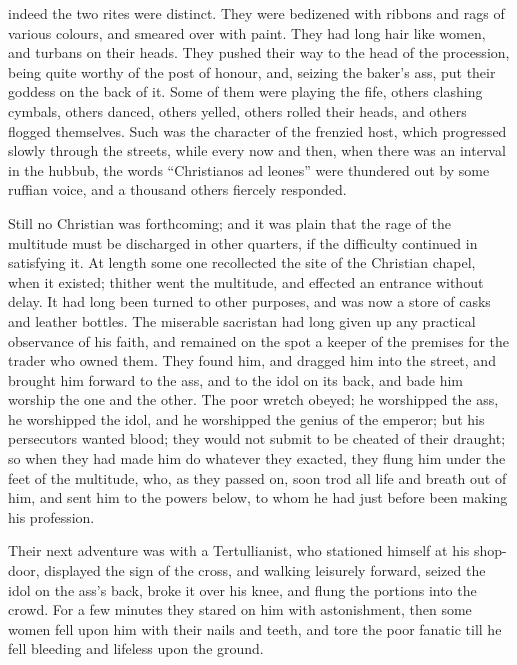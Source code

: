 indeed the two rites were distinct. They were bedizened with ribbons
and rags of various colours, and smeared over with paint. They had
long hair like women, and turbans on their heads. They pushed their
way to the head of the procession, being quite worthy of the post of
honour, and, seizing the baker's ass, put their goddess on the back of
it. Some of them were playing the fife, others clashing cymbals,
others danced, others yelled, others rolled their heads, and others
flogged themselves. Such was the character of the frenzied host, which
progressed slowly through the streets, while every now and then, when
there was an interval in the hubbub, the words ``Christianos ad
leones'' were thundered out by some ruffian voice, and a thousand
others fiercely responded.

Still no Christian was forthcoming; and it was plain that the rage
of the multitude must be discharged in other quarters, if the
difficulty continued in satisfying it. At length some one recollected
the site of the Christian chapel, when it existed; thither went the
multitude, and effected an entrance without delay. It had long
been turned to other purposes, and was now a store of casks and
leather bottles. The miserable sacristan had long given up any
practical observance of his faith, and remained on the spot a keeper
of the premises for the trader who owned them. They found him, and
dragged him into the street, and brought him forward to the ass, and
to the idol on its back, and bade him worship the one and the other.
The poor wretch obeyed; he worshipped the ass, he worshipped the idol,
and he worshipped the genius of the emperor; but his persecutors
wanted blood; they would not submit to be cheated of their draught; so
when they had made him do whatever they exacted, they flung him under
the feet of the multitude, who, as they passed on, soon trod all life
and breath out of him, and sent him to the powers below, to whom he
had just before been making his profession.

Their next adventure was with a Tertullianist, who stationed
himself at his shop-door, displayed the sign of the cross, and walking
leisurely forward, seized the idol on the ass's back, broke it over
his knee, and flung the portions into the crowd. For a few minutes
they stared on him with astonishment, then some women fell upon him
with their nails and teeth, and tore the poor fanatic till he fell
bleeding and lifeless upon the ground.

